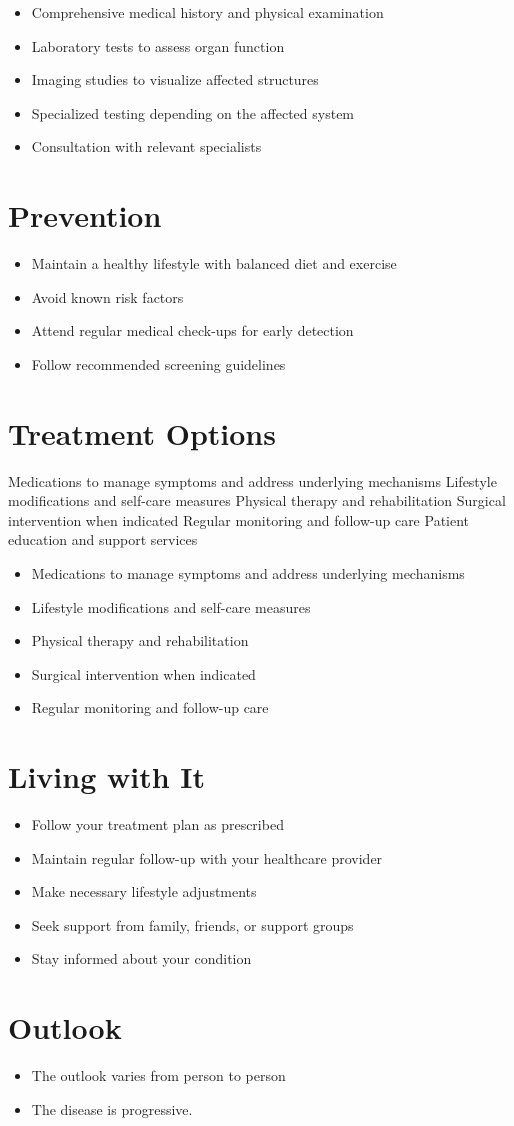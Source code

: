 \begin{itemize}[noitemsep]
  \item Comprehensive medical history and physical examination
  \item Laboratory tests to assess organ function
  \item Imaging studies to visualize affected structures
  \item Specialized testing depending on the affected system
  \item Consultation with relevant specialists
\end{itemize}
\section{Prevention}
\begin{itemize}[noitemsep]
  \item Maintain a healthy lifestyle with balanced diet and exercise
  \item Avoid known risk factors
  \item Attend regular medical check-ups for early detection
  \item Follow recommended screening guidelines
\end{itemize}
\section{Treatment Options}
Medications to manage symptoms and address underlying mechanisms Lifestyle modifications and self-care measures Physical therapy and rehabilitation Surgical intervention when indicated Regular monitoring and follow-up care Patient education and support services

\begin{itemize}[noitemsep]
  \item Medications to manage symptoms and address underlying mechanisms
  \item Lifestyle modifications and self-care measures
  \item Physical therapy and rehabilitation
  \item Surgical intervention when indicated
  \item Regular monitoring and follow-up care
\end{itemize}
\section{Living with It}
\begin{itemize}[noitemsep]
  \item Follow your treatment plan as prescribed
  \item Maintain regular follow-up with your healthcare provider
  \item Make necessary lifestyle adjustments
  \item Seek support from family, friends, or support groups
  \item Stay informed about your condition
\end{itemize}
\section{Outlook}
\begin{itemize}[noitemsep]
  \item The outlook varies from person to person
  \item The disease is progressive.
\end{itemize}
